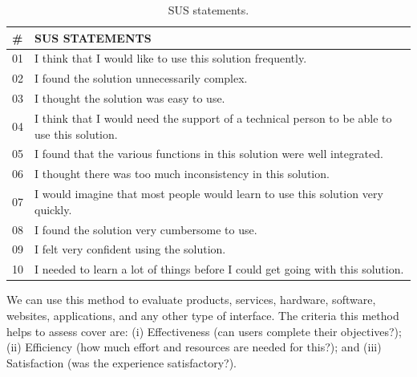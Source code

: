 \begin{table}[!htb]
    \caption{SUS statements.}
    \label{tab:SUSstatements}
    \centering
    \scriptsize
    \begin{tabular}{ll}
    \rowcolor[HTML]{C0C0C0}
    \bottomrule
    \textbf{\#} & \textbf{SUS STATEMENTS} \\ \hline
    01 & I think that I would like to use this solution frequently. \\
    02 & I found the solution unnecessarily complex. \\
    03 & I thought the solution was easy to use. \\
    04 & I think that I would need the support of a technical person to be able to use this solution. \\
    05 & I found that the various functions in this solution were well integrated. \\
    06 & I thought there was too much inconsistency in this solution. \\
    07 & I would imagine that most people would learn to use this solution very quickly. \\
    08 & I found the solution very cumbersome to use. \\
    09 & I felt very confident using the solution. \\
    10 & I needed to learn a lot of things before I could get going with this solution. \\ \toprule
    \end{tabular}
\end{table}

We can use this method to evaluate products, services, hardware, software, websites, applications, and any other type of interface.
The criteria this method helps to assess cover are: (i) Effectiveness (can users complete their objectives?); (ii) Efficiency (how much effort and resources are needed for this?); and (iii) Satisfaction (was the experience satisfactory?).


